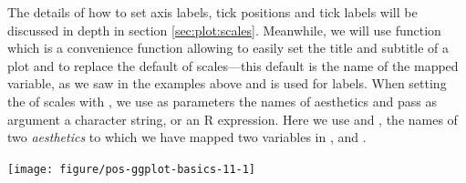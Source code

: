 \documentclass[krantz2]{krantz}\usepackage{knitr}%
\begin{document}
The details of how to set axis labels, tick positions and tick labels will be discussed in depth in section \ref{sec:plot:scales}. Meanwhile, we will use function  which is a convenience function allowing to easily set the title and subtitle of a plot and to replace the default  of scales---this default is the name of the mapped variable, as we saw in the examples above and is used for labels. When setting the  of scales with , we use as parameters the names of aesthetics and pass as argument a character string, or an R expression. Here we use  and , the names of two \emph{aesthetics} to which we have mapped two variables in ,  and .

\begin{knitrout}\footnotesize
{}\color{fgcolor}\begin{kframe}
\begin{alltt}
\hlstd{(} 
       \hlstd{(}    \hlopt{+}
  \hlstd{()} \hlopt{+}
  \hlstd{(} \hlstd{=} \hlstd{,}
        \hlstd{=} \hlstd{,}
        \hlstd{=} \hlstd{,}
        \hlstd{=} \hlstd{)}
\end{alltt}
\end{kframe}

{\centering \texttt{[image: figure/pos-ggplot-basics-11-1]} 

}



\end{knitrout}
\end{document}
